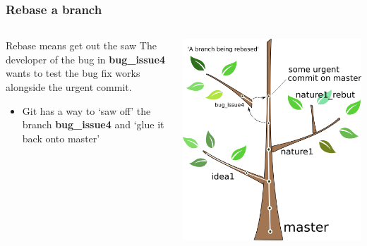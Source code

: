 \documentclass{beamer}
\begin{document}
\begin{frame}
  \frametitle{Rebase a branch}
  \begin{columns}[T]
    \begin{column}{.5\textwidth}
      \begin{block}{\alert{Rebase} means get out the saw}
        The developer of the bug in \textbf{bug\_issue4} wants to test the bug
        fix works alongside the urgent commit.
        \begin{itemize}
          \item Git has a way to `saw off' the branch  \textbf{bug\_issue4}
            and `glue it back onto master'
        \end{itemize}
      \end{block}
    \end{column}
    \begin{column}{.5\textwidth}
      \includegraphics[width=\textwidth]{tree_rebase2.png}
    \end{column}
  \end{columns}
\end{frame}
\end{document}
